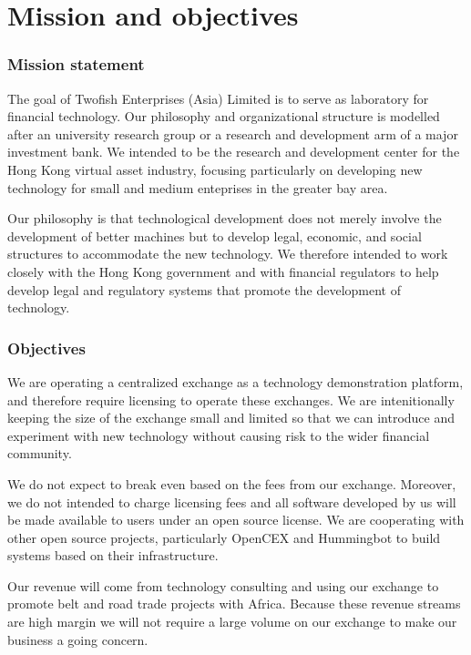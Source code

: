 \chapter{Mission and objectives}

\subsection{Mission statement}

The goal of Twofish Enterprises (Asia) Limited is to serve as
laboratory for financial technology.  Our philosophy and
organizational structure is modelled after an university research
group or a research and development arm of a major investment bank.
We intended to be the research and development center for the Hong
Kong virtual asset industry, focusing particularly on developing new
technology for small and medium enteprises in the greater bay area.

Our philosophy is that technological development does not merely
involve the development of better machines but to develop legal,
economic, and social structures to accommodate the new technology.  We
therefore intended to work closely with the Hong Kong government and
with financial regulators to help develop legal and regulatory systems
that promote the development of technology.

\subsection{Objectives}
We are operating a centralized exchange as a technology demonstration
platform, and therefore require licensing to operate these exchanges.
We are intenitionally keeping the size of the exchange small and
limited so that we can introduce and experiment with new technology
without causing risk to the wider financial community.

We do not expect to break even based on the fees from our exchange.
Moreover, we do not intended to charge licensing fees and all software
developed by us will be made available to users under an open source
license.  We are cooperating with other open source projects,
particularly OpenCEX and Hummingbot to build systems based on their
infrastructure.

Our revenue will come from technology consulting and using our
exchange to promote belt and road trade projects with Africa.  Because
these revenue streams are high margin we will not require a large
volume on our exchange to make our business a going concern.


